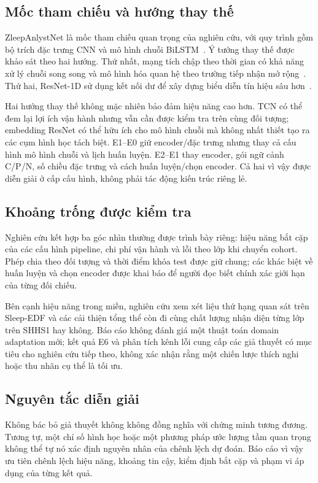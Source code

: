\subsection{Mốc tham chiếu và hướng thay thế}

ZleepAnlystNet là mốc tham chiếu quan trọng của nghiên cứu, với quy trình gồm bộ trích đặc trưng CNN và mô hình chuỗi BiLSTM~\cite{jadhav2024zleepanlystnet}. Ý tưởng thay thế được khảo sát theo hai hướng. Thứ nhất, mạng tích chập theo thời gian có khả năng xử lý chuỗi song song và mô hình hóa quan hệ theo trường tiếp nhận mở rộng~\cite{bai2018tcn}. Thứ hai, ResNet-1D sử dụng kết nối dư để xây dựng biểu diễn tín hiệu sâu hơn~\cite{he2016resnet}.

Hai hướng thay thế không mặc nhiên bảo đảm hiệu năng cao hơn. TCN có thể đem lại lợi ích vận hành nhưng vẫn cần được kiểm tra trên cùng đối tượng; embedding ResNet có thể hữu ích cho mô hình chuỗi mà không nhất thiết tạo ra các cụm hình học tách biệt. E1--E0 giữ encoder/đặc trưng nhưng thay cả cấu hình mô hình chuỗi và lịch huấn luyện. E2--E1 thay encoder, gói ngữ cảnh C/P/N, số chiều đặc trưng và cách huấn luyện/chọn encoder. Cả hai vì vậy được diễn giải ở cấp cấu hình, không phải tác động kiến trúc riêng lẻ.

\subsection{Khoảng trống được kiểm tra}

Nghiên cứu kết hợp ba góc nhìn thường được trình bày riêng: hiệu năng bắt cặp của các cấu hình pipeline, chi phí vận hành và lỗi theo lớp khi chuyển cohort. Phép chia theo đối tượng và thời điểm khóa test được giữ chung; các khác biệt về huấn luyện và chọn encoder được khai báo để người đọc biết chính xác giới hạn của từng đối chiếu.

Bên cạnh hiệu năng trong miền, nghiên cứu xem xét liệu thứ hạng quan sát trên Sleep-EDF và các cải thiện tổng thể còn đi cùng chất lượng nhận diện từng lớp trên SHHS1 hay không. Báo cáo không đánh giá một thuật toán domain adaptation mới; kết quả E6 và phân tích kênh lỗi cung cấp các giả thuyết có mục tiêu cho nghiên cứu tiếp theo, không xác nhận rằng một chiến lược thích nghi hoặc thu nhãn cụ thể là tối ưu.

\subsection{Nguyên tắc diễn giải}

Không bác bỏ giả thuyết không không đồng nghĩa với chứng minh tương đương. Tương tự, một chỉ số hình học hoặc một phương pháp ước lượng tầm quan trọng không thể tự nó xác định nguyên nhân của chênh lệch dự đoán. Báo cáo vì vậy ưu tiên chênh lệch hiệu năng, khoảng tin cậy, kiểm định bắt cặp và phạm vi áp dụng của từng kết quả.
